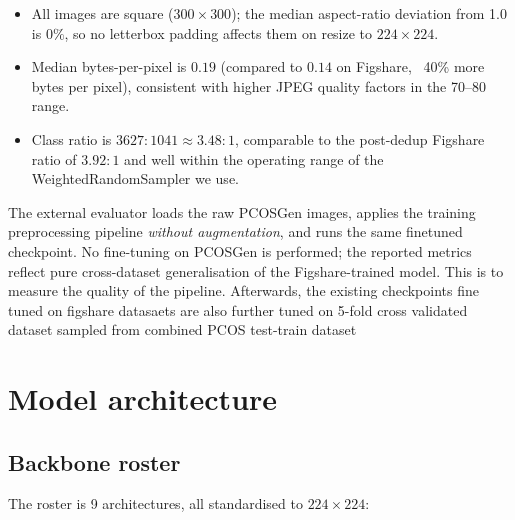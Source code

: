 \documentclass[10pt,a4paper]{article}
\begin{document}
\begin{itemize}
    \item All images are square ($300 \times 300$); the median
    aspect-ratio deviation from 1.0 is $0\%$, so no letterbox padding
    affects them on resize to $224 \times 224$.
    \item Median bytes-per-pixel is $0.19$ (compared to $0.14$ on
    Figshare, ~40\% more bytes per pixel), consistent with higher JPEG
    quality factors in the 70--80 range.
    \item Class ratio is $3627 : 1041 \approx 3.48 : 1$, comparable to
    the post-dedup Figshare ratio of $3.92 : 1$ and well within the
    operating range of the WeightedRandomSampler we use.
\end{itemize}

The external evaluator loads the raw PCOSGen images, applies the training preprocessing pipeline
\emph{without augmentation}, and runs the same finetuned checkpoint. No fine-tuning on PCOSGen is
performed; the reported metrics reflect pure cross-dataset
generalisation of the Figshare-trained model. This is to measure the quality of the pipeline. Afterwards, the existing checkpoints fine tuned on figshare datasaets are also further tuned on 5-fold cross validated dataset sampled from combined PCOS test-train dataset

\section{Model architecture}

\subsection{Backbone roster}

The roster is 9 architectures, all standardised to $224 \times 224$:
\end{document}
